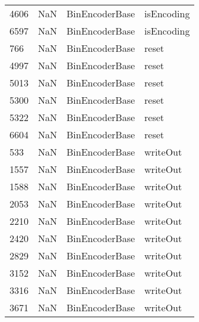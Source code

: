 \begin{tabular}{llll}
4606 &                   NaN &             BinEncoderBase &                                isEncoding \\
6597 &                   NaN &             BinEncoderBase &                                isEncoding \\
766  &                   NaN &             BinEncoderBase &                                     reset \\
4997 &                   NaN &             BinEncoderBase &                                     reset \\
5013 &                   NaN &             BinEncoderBase &                                     reset \\
5300 &                   NaN &             BinEncoderBase &                                     reset \\
5322 &                   NaN &             BinEncoderBase &                                     reset \\
6604 &                   NaN &             BinEncoderBase &                                     reset \\
533  &                   NaN &             BinEncoderBase &                                  writeOut \\
1557 &                   NaN &             BinEncoderBase &                                  writeOut \\
1588 &                   NaN &             BinEncoderBase &                                  writeOut \\
2053 &                   NaN &             BinEncoderBase &                                  writeOut \\
2210 &                   NaN &             BinEncoderBase &                                  writeOut \\
2420 &                   NaN &             BinEncoderBase &                                  writeOut \\
2829 &                   NaN &             BinEncoderBase &                                  writeOut \\
3152 &                   NaN &             BinEncoderBase &                                  writeOut \\
3316 &                   NaN &             BinEncoderBase &                                  writeOut \\
3671 &                   NaN &             BinEncoderBase &                                  writeOut \\

\end{tabular}
